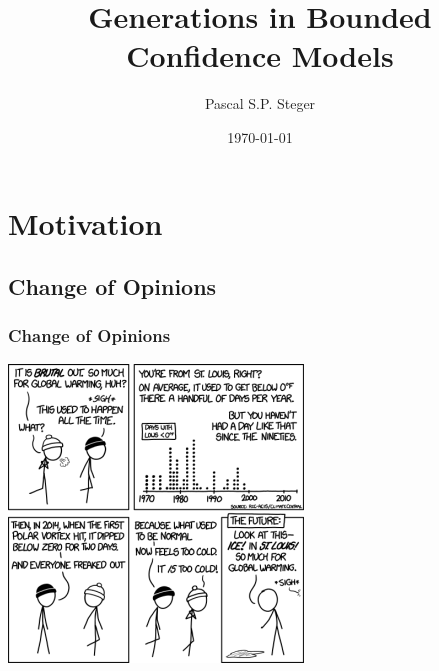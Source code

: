 \documentclass[10pt]{beamer}
\title[Generations in Bounded Confidence]{Generations in Bounded
  Confidence Models}
\author{Pascal S.P. Steger}
\institute{ETH Zurich}
\date{\today}
\begin{document}
\begingroup
{}
\begin{frame}
\maketitle
\end{frame}
\endgroup


\section{Motivation} \label{sec:motivation}

\subsection{Change of Opinions}
\begin{frame}\frametitle{Change of Opinions}
    \begin{center}
        \includegraphics[height=0.8\textheight]{src/opiniondynamics}
    \end{center}
    

\end{frame}
\end{document}
